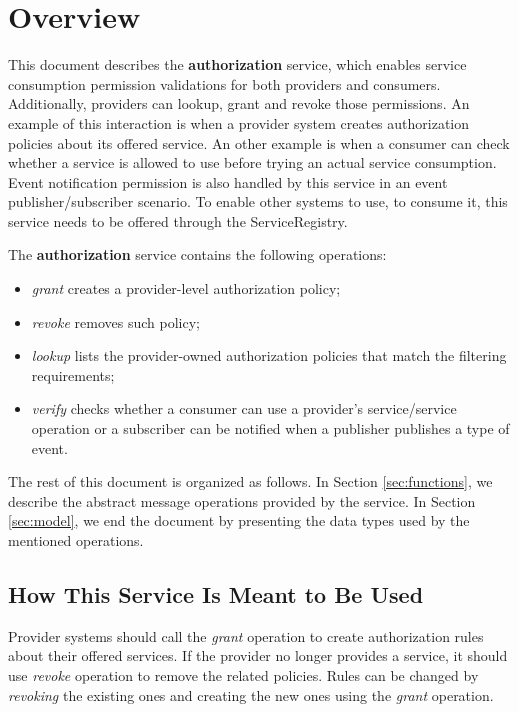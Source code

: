 \documentclass[a4paper]{arrowhead}
\begin{document}
\section{Overview}
\label{sec:overview}
This document describes the \textbf{authorization} service, which enables service consumption permission validations for both providers and consumers.  Additionally, providers can lookup, grant and revoke those permissions. An example of this interaction is when a provider system creates authorization policies about its offered service. An other example is when a consumer can check whether a service is allowed to use before trying an actual service consumption. Event notification permission is also handled by this service in an event publisher/subscriber scenario. To enable other systems to use, to consume it, this service needs to be offered through the ServiceRegistry.

The \textbf{authorization} service contains the following operations:

\begin{itemize}
    \item \textit{grant} creates a provider-level authorization policy;
    \item \textit{revoke} removes such policy;
    \item \textit{lookup} lists the provider-owned authorization policies that match the filtering requirements;
    \item \textit{verify} checks whether a consumer can use a provider's service/service operation or a subscriber can be notified when a publisher publishes a type of event.
\end{itemize}

The rest of this document is organized as follows.
In Section \ref{sec:functions}, we describe the abstract message operations provided by the service.
In Section \ref{sec:model}, we end the document by presenting the data types used by the mentioned operations.

\subsection{How This Service Is Meant to Be Used}
Provider systems should call the \textit{grant} operation to create authorization rules about their offered services. If the provider no longer provides a service, it should use \textit{revoke} operation to remove the related policies. Rules can be changed by \textit{revoking} the existing ones and creating the new ones using the \textit{grant} operation.
\end{document}

